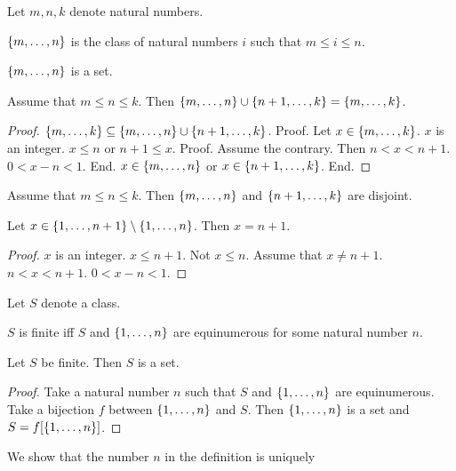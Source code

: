 \documentclass{article}
\begin{document}
\begin{forthel}
Let $m,n,k$ denote natural numbers.

\begin{definition}
$\{m,\dots,n\}$ is the class of
natural numbers $i$ such that $m \leq i \leq n$.
\end{definition}

\begin{lemma}
$\{m,\dots,n\}$ is a set.
\end{lemma}

\begin{lemma} 
Assume that $m \leq n \leq k$.
Then $\{m,\dots,n\} \cup \{n+1,\dots,k\} = \{m,\dots,k\}$.
\end{lemma}
\begin{proof}
$\{m,\dots,k\} \subseteq \{m,\dots,n\} \cup \{n+1,\dots,k\}$.
Proof.
Let $x \in \{m,\dots,k\}$. $x$ is an integer. 
$x \leq n$ or $n+1 \leq x$. Proof. Assume the contrary. Then $n < x < n+1$. $0 < x - n < 1$. End.
$x \in \{m,\dots,n\}$ or $x \in \{n+1,\dots,k\}$. End.
\end{proof}


\begin{lemma} Assume that $m \leq n \leq k$.
Then $\{m,\dots,n\}$ and $\{n+1,\dots,k\}$ are disjoint.
\end{lemma}

\begin{lemma} Let $x \in \{1,\dots,n+1\} \setminus \{1,\dots,n\}$.
Then $x = n+1$.
\end{lemma}
\begin{proof}
$x$ is an integer.
$x \leq n+1$. Not $x \leq n$.
Assume that $x \neq n+1$.
$n < x < n+1$.
$0 < x - n < 1$.
\end{proof}

Let $S$ denote a class.

\begin{definition}
$S$ is finite iff $S$ and $\{1,\dots,n\}$ are equinumerous for some 
natural number $n$.
\end{definition}

\begin{lemma}
Let $S$ be finite. Then $S$ is a set.
\end{lemma}
\begin{proof}
Take a natural number $n$ such that $S$ and $\{1,\dots,n\}$ are equinumerous.
Take a bijection $f$ between $\{1,\dots,n\}$ and $S$.
Then $\{1,\dots,n\}$ is a set and $S = f[\{1,\dots,n\}]$.
\end{proof}
\end{forthel}
%
We show that the number $n$ in the definition is uniquely
\end{document}
